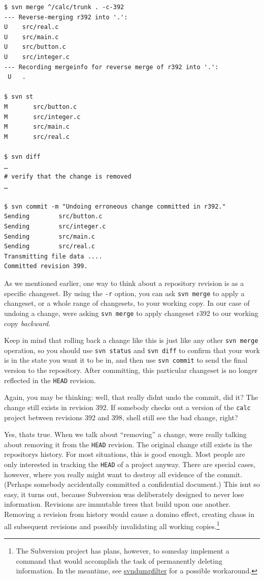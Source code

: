 \begin{verbatim}
$ svn merge ^/calc/trunk . -c-392
--- Reverse-merging r392 into '.':
U    src/real.c
U    src/main.c
U    src/button.c
U    src/integer.c
--- Recording mergeinfo for reverse merge of r392 into '.':
 U   .

$ svn st
M       src/button.c
M       src/integer.c
M       src/main.c
M       src/real.c

$ svn diff
…
# verify that the change is removed
…

$ svn commit -m "Undoing erroneous change committed in r392."
Sending        src/button.c
Sending        src/integer.c
Sending        src/main.c
Sending        src/real.c
Transmitting file data ....
Committed revision 399.
\end{verbatim}

As we mentioned earlier, one way to think about a repository revision is
as a specific changeset. By using the \texttt{-r} option, you can ask
\texttt{svn\ merge} to apply a changeset, or a whole range of
changesets, to your working copy. In our case of undoing a change,
we\textquotesingle re asking \texttt{svn\ merge} to apply changeset r392
to our working copy \emph{backward}.

Keep in mind that rolling back a change like this is just like any other
\texttt{svn\ merge} operation, so you should use \texttt{svn\ status}
and \texttt{svn\ diff} to confirm that your work is in the state you
want it to be in, and then use \texttt{svn\ commit} to send the final
version to the repository. After committing, this particular changeset
is no longer reflected in the \texttt{HEAD} revision.

Again, you may be thinking: well, that really didn\textquotesingle t
undo the commit, did it? The change still exists in revision 392. If
somebody checks out a version of the \texttt{calc} project between
revisions 392 and 398, she\textquotesingle ll still see the bad change,
right?

Yes, that\textquotesingle s true. When we talk about ``removing'' a
change, we\textquotesingle re really talking about removing it from the
\texttt{HEAD} revision. The original change still exists in the
repository\textquotesingle s history. For most situations, this is good
enough. Most people are only interested in tracking the \texttt{HEAD} of
a project anyway. There are special cases, however, where you really
might want to destroy all evidence of the commit. (Perhaps somebody
accidentally committed a confidential document.) This
isn\textquotesingle t so easy, it turns out, because Subversion was
deliberately designed to never lose information. Revisions are immutable
trees that build upon one another. Removing a revision from history
would cause a domino effect, creating chaos in all subsequent revisions
and possibly invalidating all working copies.\footnote{The Subversion
  project has plans, however, to someday implement a command that would
  accomplish the task of permanently deleting information. In the
  meantime, see
  \hyperref[svn.reposadmin.maint.tk.svndumpfilter]{svndumpfilter} for a
  possible workaround.}


